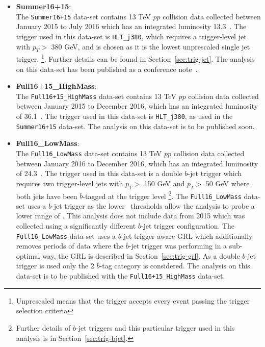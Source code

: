 \begin{itemize}[leftmargin=*]
\item\textbf{Summer16+15}: \\
  The \verb|Summer16+15| data-set contains 13 TeV $pp$ collision data collected
  between January 2015 to July 2016 which has an integrated luminosity 13.3~\ifb.
  The trigger used in this data-set is \verb|HLT_j380|,
  which requires a trigger-level jet with $p_T >$ 380 GeV, 
  and is chosen as it is the lowest unprescaled single jet trigger.
  \footnote{Unprescaled means that the trigger accepts every event passing the trigger selection criteria}.
  Further details can be found in Section~\ref{sec:trig-jet}.
  The analysis on this data-set has been published as a conference note~\cite{dibjet-ichep_conf}. \\
  
\item\textbf{Full16+15\_HighMass}:\\
  The \verb|Full16+15_HighMass| data-set contains 13 TeV $pp$ collision data collected
  between January 2015 to December 2016, which has an integrated luminosity of 36.1~\ifb.
  The trigger used in this data-set is \verb|HLT_j380|, as used in the \verb|Summer16+15| data-set.
  The analysis on this data-set is to be published soon.\\
  
\item\textbf{Full16\_LowMass}: \\
  The \verb|Full16_LowMass| data-set contains 13 TeV $pp$ collision data collected
  between January 2016 to December 2016, which has an integrated luminosity of 24.3~\ifb.
  The trigger used in this data-set is a double $b$-jet trigger 
  which requires two trigger-level jets with $p_T >$ 150 GeV and $p_T >$ 50 GeV
  where both jets have been $b$-tagged at the trigger level
  \footnote{Further details of $b$-jet triggers and this particular trigger used in this analysis is in Section~\ref{sec:trig-bjet}.}.
  The \verb|Full16_LowMass| data-set uses a $b$-jet trigger as the lower \pT~thresholds allow
  the analysis to probe a lower range of \mjj.
  This analysis does not include data from 2015 which was collected using a significantly different $b$-jet trigger configuration.
  The \verb|Full16_LowMass| data-set uses a $b$-jet trigger aware GRL which additionally
  removes periods of data where the $b$-jet trigger was performing in a sub-optimal way,
  the GRL is described in Section~\ref{sec:trig-grl}.
  As a double $b$-jet trigger is used only the 2 $b$-tag category is considered.
  The analysis on this data-set is to be published with the \verb|Full16+15_HighMass| data-set.

\end{itemize}

